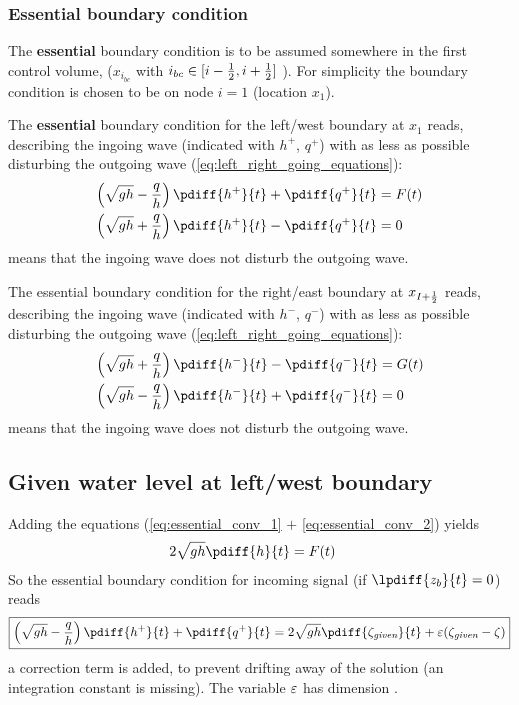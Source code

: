 \subsubsection{Essential boundary condition}
The \textbf{essential} boundary condition is to be assumed somewhere in the first control volume, ($x_{i_{bc}}$ with $i_{bc} \in [i-\frac{1}{2}, i+\frac{1}{2}]$ ).
For simplicity the boundary condition is chosen to be on node $i=1$ (location $x_{1}$).

The \textbf{essential} boundary condition for the left/west boundary at $x_{1}$ reads, describing the ingoing wave (indicated with $h^+$, $q^+$) with as less as possible disturbing the outgoing wave (\autoref{eq:left_right_going_equations}):
\begin{align}
    \left(\sqrt{gh} - \frac{q}{h}\right) \pdiff{h^{+}}{t} + \pdiff{q^{+}}{t} & = F(t)
    \label{eq:essential_conv_1}
    \\
    \left(\sqrt{gh} + \frac{q}{h}\right) \pdiff{h^{+}}{t} - \pdiff{q^{+}}{t} & = 0
    \label{eq:essential_conv_2}
\end{align}
 means that the ingoing wave does not disturb the outgoing wave.

The essential boundary condition for the right/east boundary at $x_{I+\frac{1}{2}}$ reads, describing the ingoing wave (indicated with $h^-$, $q^-$) with as less as possible disturbing the outgoing wave (\autoref{eq:left_right_going_equations}):\begin{align}
    \left(\sqrt{gh} + \frac{q}{h}\right) \pdiff{h^{-}}{t} - \pdiff{q^{-}}{t} & = G(t)
    \label{eq:essential_conv_3}
    \\
    \left(\sqrt{gh} - \frac{q}{h}\right) \pdiff{h^{-}}{t} + \pdiff{q^{-}}{t} & = 0
    \label{eq:essential_conv_4}
\end{align}
 means that the ingoing wave does not disturb the outgoing wave.


%
\subsection*{Given water level at left/west boundary}


Adding the equations (\eqref{eq:essential_conv_1} $+$ \eqref{eq:essential_conv_2}) yields
\begin{align}
    2 \sqrt{gh} \pdiff{h}{t} & = F(t)
\end{align}
%
So the essential boundary condition for incoming signal (if $\lpdiff{z_b}{t} = 0$) reads
\begin{align}
    {\boxed{
        \left(\sqrt{gh} - \frac{q}{h}\right) \pdiff{h^{+}}{t} + \pdiff{q^{+}}{t}  = 2 \sqrt{gh} \pdiff{\zeta_{\textit{given}}}{t}  + \eps(\zeta_{\textit{given}} - \zeta)
        }}\label{eq:essential_bc_zeta}
\end{align}
a correction term is added, to prevent drifting away of the solution (an integration constant is missing).
The variable $\varepsilon$ has dimension \bunit{\metre\per\square\second}.

